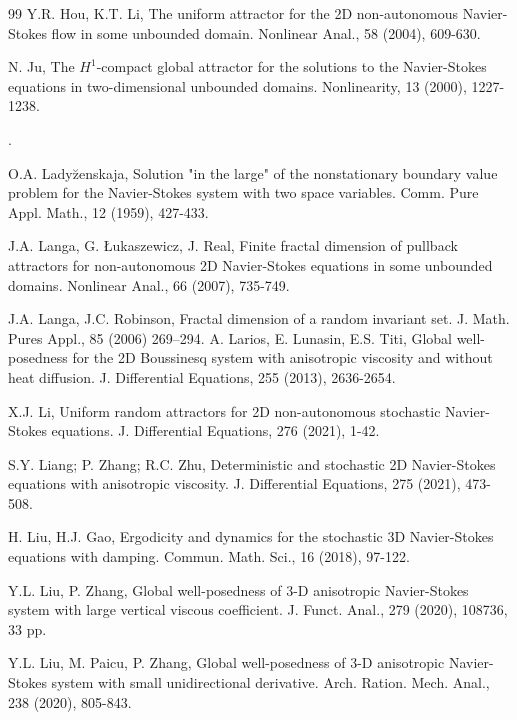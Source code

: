 \documentclass{elsarticle}
\theoremstyle{definition}
\numberwithin{equation}{section}
\begin{document}
\begin{thebibliography}{99}
  Y.R. Hou, K.T. Li,    The uniform attractor for the 2D non-autonomous Navier-Stokes flow in some unbounded domain. Nonlinear Anal., 58 (2004), 609-630.

 N. Ju,   The $H^1$-compact global attractor for the solutions to the Navier-Stokes equations in two-dimensional unbounded domains. Nonlinearity, 13 (2000), 1227-1238.




.

  O.A. Lady\u{z}enskaja,    Solution "in the large" of the nonstationary boundary value problem for the Navier-Stokes system with two space variables. Comm. Pure Appl. Math., 12 (1959), 427-433.

  J.A. Langa, G. {\L}ukaszewicz, J. Real,   Finite fractal dimension of pullback attractors for non-autonomous 2D Navier-Stokes equations in some unbounded domains. Nonlinear Anal., 66 (2007), 735-749.

   J.A. Langa, J.C. Robinson,   Fractal dimension of a random invariant set. J. Math. Pures Appl., 85 (2006) 269–294.
A. Larios, E. Lunasin, E.S. Titi,  Global well-posedness for the 2D Boussinesq system with anisotropic viscosity and without heat diffusion. J. Differential Equations, 255 (2013),  2636-2654.

 X.J. Li,    Uniform random attractors for 2D non-autonomous stochastic Navier-Stokes equations. J. Differential Equations, 276 (2021), 1-42.


S.Y. Liang; P. Zhang; R.C. Zhu,  Deterministic and stochastic 2D Navier-Stokes equations with anisotropic viscosity. J. Differential Equations, 275 (2021), 473-508.

   H. Liu, H.J. Gao,   Ergodicity and dynamics for the stochastic 3D Navier-Stokes equations with damping. Commun. Math. Sci., 16 (2018), 97-122.

Y.L. Liu, P. Zhang, Global well-posedness of 3-D anisotropic Navier-Stokes system with large vertical viscous coefficient. J. Funct. Anal., 279 (2020),  108736, 33 pp.

Y.L. Liu, M. Paicu, P. Zhang, Global well-posedness of 3-D anisotropic Navier-Stokes system with small unidirectional derivative. Arch. Ration. Mech. Anal., 238 (2020), 805-843.







\end{thebibliography}
\end{document}
